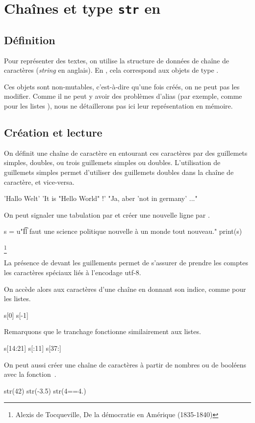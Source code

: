 \section{Chaînes et type \texttt{str} en \python}

\subsection{Définition}

Pour représenter des textes, on utilise la structure de données de \og chaîne de caractères \fg{} (\emph{string} en anglais). En \python, cela correspond aux objets de type .

Ces objets sont non-mutables, c'est-à-dire qu'une fois créés, on ne peut pas les modifier. 
Comme il ne peut y avoir des problèmes d'alias (par exemple, comme pour les listes \python), nous ne détaillerons pas ici leur représentation en mémoire. 

\subsection{Création et lecture}

On définit une chaîne de caractère en entourant ces caractères par des guillemets simples, doubles, ou trois guillemets simples ou doubles. 
L'utilisation de guillemets simples permet d'utiliser des guillemets doubles dans la chaîne de caractère, et vice-versa.
\begin{pyconsole}
'Hallo Welt'
'It is "Hello World" !'
"Ja, aber 'not in germany' ..."
\end{pyconsole}

On peut signaler une tabulation par \pyv{\t} et créer une nouvelle ligne par \pyv{\n}.

\begin{pyconsole}
s = u"\t Il faut une science politique nouvelle à un monde tout nouveau.\n[...]"
print(s)
\end{pyconsole}

\footnote{Alexis de Tocqueville, De la démocratie en Amérique (1835-1840)}

\begin{rem}
La présence de  devant les guillements permet de s'assurer de prendre les comptes les caractères spéciaux liés à l'encodage utf-8.
\end{rem}

On accède alors aux caractères d'une chaîne en donnant son indice, comme pour les listes. 
\begin{pyconsole}
s[0]
s[-1]
\end{pyconsole}
Remarquons que le tranchage fonctionne similairement aux listes.
\begin{pyconsole}
s[14:21]
s[:11]
s[37:]
\end{pyconsole}
On peut aussi créer une chaîne de caractères à partir de nombres ou de booléens avec la fonction~.
\begin{pyconsole}
str(42)
str(-3.5)
str(4==4.)
\end{pyconsole}

